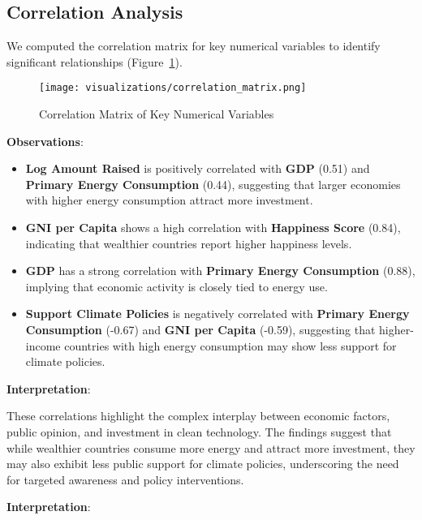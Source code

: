 \documentclass[sigconf]{acmart}
\begin{document}
\subsection{Correlation Analysis}

We computed the correlation matrix for key numerical variables to identify significant relationships (Figure~\ref{fig:correlation_matrix}). 

\begin{figure}[htpb]
    \centering
    \texttt{[image: visualizations/correlation\_matrix.png]}
    \caption{Correlation Matrix of Key Numerical Variables}
    \label{fig:correlation_matrix}
\end{figure}

\textbf{Observations}:

\begin{itemize}
    \item \textbf{Log Amount Raised} is positively correlated with \textbf{GDP} (0.51) and \textbf{Primary Energy Consumption} (0.44), suggesting that larger economies with higher energy consumption attract more investment.
    \item \textbf{GNI per Capita} shows a high correlation with \textbf{Happiness Score} (0.84), indicating that wealthier countries report higher happiness levels.
    \item \textbf{GDP} has a strong correlation with \textbf{Primary Energy Consumption} (0.88), implying that economic activity is closely tied to energy use.
    \item \textbf{Support Climate Policies} is negatively correlated with \textbf{Primary Energy Consumption} (-0.67) and \textbf{GNI per Capita} (-0.59), suggesting that higher-income countries with high energy consumption may show less support for climate policies.
\end{itemize}

\textbf{Interpretation}:

These correlations highlight the complex interplay between economic factors, public opinion, and investment in clean technology. The findings suggest that while wealthier countries consume more energy and attract more investment, they may also exhibit less public support for climate policies, underscoring the need for targeted awareness and policy interventions.

\textbf{Interpretation}:
\end{document}
